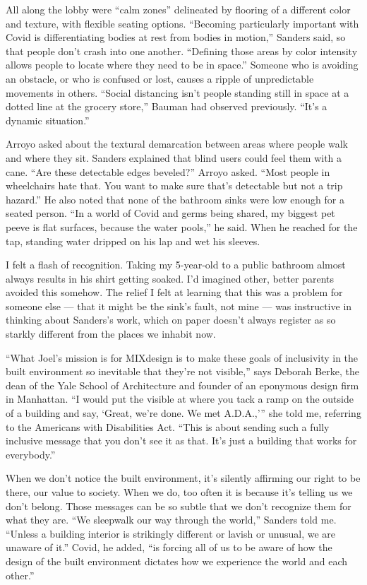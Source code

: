 All along the lobby were ``calm zones'' delineated by flooring of a
different color and texture, with flexible seating options. ``Becoming
particularly important with Covid is differentiating bodies at rest from
bodies in motion,'' Sanders said, so that people don't crash into one
another. ``Defining those areas by color intensity allows people to
locate where they need to be in space.'' Someone who is avoiding an
obstacle, or who is confused or lost, causes a ripple of unpredictable
movements in others. ``Social distancing isn't people standing still in
space at a dotted line at the grocery store,'' Bauman had observed
previously. ``It's a dynamic situation.''

Arroyo asked about the textural demarcation between areas where people
walk and where they sit. Sanders explained that blind users could feel
them with a cane. ``Are these detectable edges beveled?'' Arroyo asked.
``Most people in wheelchairs hate that. You want to make sure that's
detectable but not a trip hazard.'' He also noted that none of the
bathroom sinks were low enough for a seated person. ``In a world of
Covid and germs being shared, my biggest pet peeve is flat surfaces,
because the water pools,'' he said. When he reached for the tap,
standing water dripped on his lap and wet his sleeves.

I felt a flash of recognition. Taking my 5-year-old to a public bathroom
almost always results in his shirt getting soaked. I'd imagined other,
better parents avoided this somehow. The relief I felt at learning that
this was a problem for someone else --- that it might be the sink's
fault, not mine --- was instructive in thinking about Sanders's work,
which on paper doesn't always register as so starkly different from the
places we inhabit now.

``What Joel's mission is for MIXdesign is to make these goals of
inclusivity in the built environment so inevitable that they're not
visible,'' says Deborah Berke, the dean of the Yale School of
Architecture and founder of an eponymous design firm in Manhattan. ``I
would put the visible at where you tack a ramp on the outside of a
building and say, `Great, we're done. We met A.D.A.,''' she told me,
referring to the Americans with Disabilities Act. ``This is about
sending such a fully inclusive message that you don't see it as that.
It's just a building that works for everybody.''

When we don't notice the built environment, it's silently affirming our
right to be there, our value to society. When we do, too often it is
because it's telling us we don't belong. Those messages can be so subtle
that we don't recognize them for what they are. ``We sleepwalk our way
through the world,'' Sanders told me. ``Unless a building interior is
strikingly different or lavish or unusual, we are unaware of it.''
Covid, he added, ``is forcing all of us to be aware of how the design of
the built environment dictates how we experience the world and each
other.''

